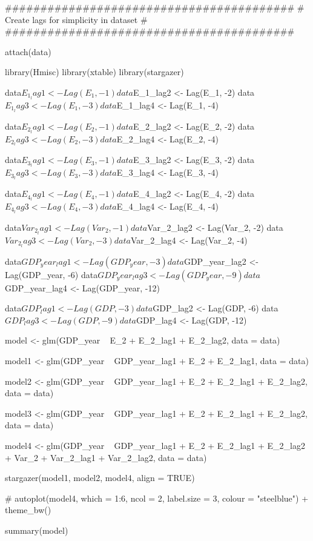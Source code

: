 




#########################################
# Create lags for simplicity in dataset #
#########################################

attach(data)

library(Hmisc)
library(xtable)
library(stargazer)

data$E_1_lag1 <- Lag(E_1, -1)
data$E_1_lag2 <- Lag(E_1, -2)
data$E_1_lag3 <- Lag(E_1, -3)
data$E_1_lag4 <- Lag(E_1, -4)

data$E_2_lag1 <- Lag(E_2, -1)
data$E_2_lag2 <- Lag(E_2, -2)
data$E_2_lag3 <- Lag(E_2, -3)
data$E_2_lag4 <- Lag(E_2, -4)

data$E_3_lag1 <- Lag(E_3, -1)
data$E_3_lag2 <- Lag(E_3, -2)
data$E_3_lag3 <- Lag(E_3, -3)
data$E_3_lag4 <- Lag(E_3, -4)

data$E_4_lag1 <- Lag(E_4, -1)
data$E_4_lag2 <- Lag(E_4, -2)
data$E_4_lag3 <- Lag(E_4, -3)
data$E_4_lag4 <- Lag(E_4, -4)

data$Var_2_lag1 <- Lag(Var_2, -1)
data$Var_2_lag2 <- Lag(Var_2, -2)
data$Var_2_lag3 <- Lag(Var_2, -3)
data$Var_2_lag4 <- Lag(Var_2, -4)

data$GDP_year_lag1 <- Lag(GDP_year, -3)
data$GDP_year_lag2 <- Lag(GDP_year, -6)
data$GDP_year_lag3 <- Lag(GDP_year, -9)
data$GDP_year_lag4 <- Lag(GDP_year, -12)

data$GDP_lag1 <- Lag(GDP, -3)
data$GDP_lag2 <- Lag(GDP, -6)
data$GDP_lag3 <- Lag(GDP, -9)
data$GDP_lag4 <- Lag(GDP, -12)


model <- glm(GDP_year ~ E_2 + E_2_lag1 + E_2_lag2, data = data)

model1 <- glm(GDP_year ~ GDP_year_lag1 + E_2 + E_2_lag1, data = data)

model2 <- glm(GDP_year ~ GDP_year_lag1 + E_2 + E_2_lag1 + E_2_lag2, data = data)

model3 <- glm(GDP_year ~ GDP_year_lag1 + E_2 + E_2_lag1 + E_2_lag2, data = data)

model4 <- glm(GDP_year ~ GDP_year_lag1 + E_2 + E_2_lag1 + E_2_lag2 + Var_2 + Var_2_lag1 + Var_2_lag2, data = data)

stargazer(model1, model2, model4, align = TRUE)

# autoplot(model4, which = 1:6, ncol = 2, label.size = 3, colour = "steelblue") + theme_bw()

summary(model)


